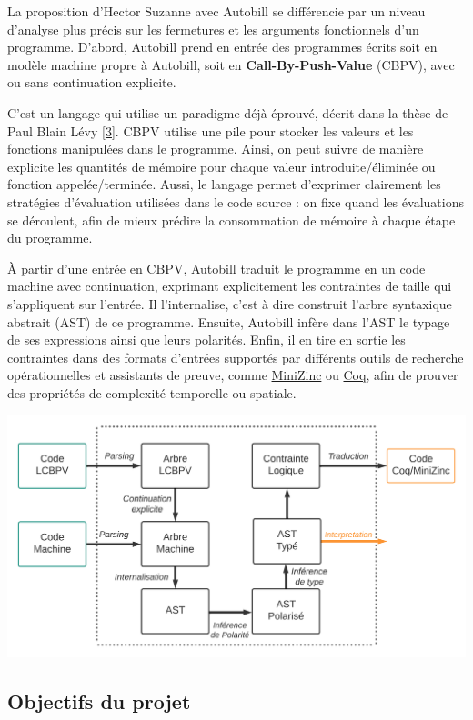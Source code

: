 \documentclass[
  12pt,
]{article}
\begin{document}
La proposition d'Hector Suzanne avec Autobill se différencie par un
niveau d'analyse plus précis sur les fermetures et les arguments
fonctionnels d'un programme. D'abord, Autobill prend en entrée des
programmes écrits soit en modèle machine propre à Autobill, soit en
\textbf{Call-By-Push-Value} (CBPV), avec ou sans continuation explicite.

C'est un langage qui utilise un paradigme déjà éprouvé, décrit dans la
thèse de Paul Blain Lévy \protect\hyperlink{biblio}{{[}3{]}}. CBPV
utilise une pile pour stocker les valeurs et les fonctions manipulées
dans le programme. Ainsi, on peut suivre de manière explicite les
quantités de mémoire pour chaque valeur introduite/éliminée ou fonction
appelée/terminée. Aussi, le langage permet d'exprimer clairement les
stratégies d'évaluation utilisées dans le code source : on fixe quand
les évaluations se déroulent, afin de mieux prédire la consommation de
mémoire à chaque étape du programme.

À partir d'une entrée en CBPV, Autobill traduit le programme en un code
machine avec continuation, exprimant explicitement les contraintes de
taille qui s'appliquent sur l'entrée. Il l'internalise, c'est à dire
construit l'arbre syntaxique abstrait (AST) de ce programme. Ensuite,
Autobill infère dans l'AST le typage de ses expressions ainsi que leurs
polarités. Enfin, il en tire en sortie les contraintes dans des formats
d'entrées supportés par différents outils de recherche opérationnelles
et assistants de preuve, comme
\href{https://www.minizinc.org/}{MiniZinc} ou
\href{https://coq.inria.fr/}{Coq}, afin de prouver des propriétés de
complexité temporelle ou spatiale.

\includegraphics{./MarkdownVersions/Rapport/Schema_Autobill.png}

\hypertarget{objectifs-du-projet}{%
\subsection{Objectifs du projet}\label{objectifs-du-projet}}
\end{document}
